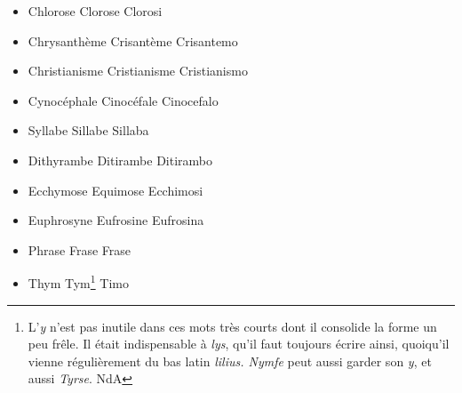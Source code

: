 \documentclass[french,twoside]{book} %
\begin{document}
\begin{itemize}[itemsep=0pt,]
\item Chlorose Clorose Clorosi
\item Chrysanthème Crisantème Crisantemo
\item Christianisme Cristianisme Cristianismo
\item Cynocéphale Cinocéfale Cinocefalo
\item Syllabe Sillabe Sillaba
\item Dithyrambe Ditirambe Ditirambo
\item Ecchymose Equimose Ecchimosi
\item Euphrosyne Eufrosine Eufrosina
\item Phrase Frase Frase
\item Thym Tym\footnote{ L’{\itshape y} n’est pas inutile dans ces mots très courts dont il consolide la forme un peu frêle. Il était indispensable à {\itshape lys}, qu’il faut toujours écrire ainsi, quoiqu’il vienne régulièrement du bas latin {\itshape lilius. Nymfe} peut aussi garder son {\itshape y}, et aussi {\itshape Tyrse}. NdA} Timo
\end{itemize}
\end{document}
